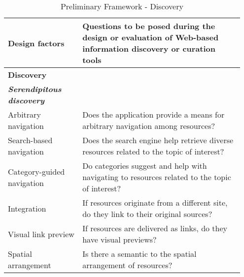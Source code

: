 \begin{table*}[htbp]
\caption{Preliminary Framework - Discovery}
\centering
\small
\begin{tabular}{|p{0.30\linewidth}|p{0.65\linewidth}|}
\hline
\textbf{\large{Design factors}}   & \textbf{\large{Questions to be posed during the design or evaluation of Web-based information discovery or curation tools 
}}  \\
\hline

\textbf{\large{Discovery}}                     &                                                                                                           \\


\emph{\textbf{Serendipitous discovery}}     &                                                                                                           \\

Arbitrary navigation         & Does the application provide a means for arbitrary navigation among resources?                              \\
Search-based navigation      & Does the search engine help retrieve diverse resources related to the topic of interest?               \\
Category-guided navigation & Do categories suggest and help with navigating to resources related to the topic of interest?           \\
Integration                  & If resources originate from a different site, do they link to their original sources?                   \\
Visual link preview               & If resources are delivered as links, do they have visual previews?                                                                        \\
Spatial arrangement          & Is there a semantic to the spatial arrangement of resources?                                                    \\


\end{tabular}
\end{table*}
